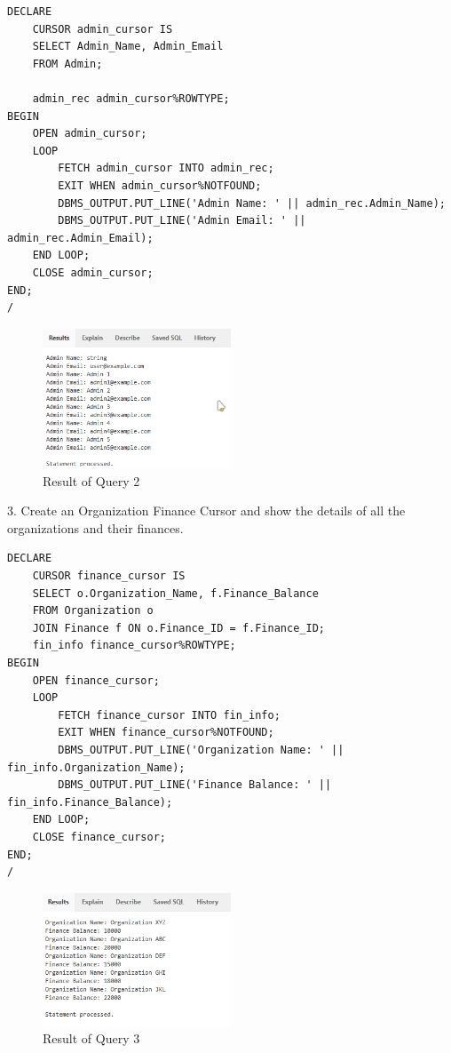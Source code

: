 \begin{lstlisting}[caption={ Query 2},label={lst:q-2}]
    DECLARE
    CURSOR admin_cursor IS
    SELECT Admin_Name, Admin_Email
    FROM Admin;
    
    admin_rec admin_cursor%ROWTYPE;
BEGIN
    OPEN admin_cursor;
    LOOP
        FETCH admin_cursor INTO admin_rec;
        EXIT WHEN admin_cursor%NOTFOUND;
        DBMS_OUTPUT.PUT_LINE('Admin Name: ' || admin_rec.Admin_Name);
        DBMS_OUTPUT.PUT_LINE('Admin Email: ' || admin_rec.Admin_Email);
    END LOOP;
    CLOSE admin_cursor;
END;
/
\end{lstlisting}
\clearpage
\begin{figure}[H]
    \centering
    \includegraphics[width=0.5\textwidth]{images/plsql/cursor/Admin Cursor.png}
    \caption{Result of Query 2}
\end{figure}
3. Create an Organization Finance Cursor and show the details of all the organizations and their finances.

\begin{lstlisting}[caption={ Query 3},label={lst:q-3}]
    DECLARE
    CURSOR finance_cursor IS
    SELECT o.Organization_Name, f.Finance_Balance
    FROM Organization o
    JOIN Finance f ON o.Finance_ID = f.Finance_ID;
    fin_info finance_cursor%ROWTYPE;
BEGIN
    OPEN finance_cursor;
    LOOP
        FETCH finance_cursor INTO fin_info;
        EXIT WHEN finance_cursor%NOTFOUND;
        DBMS_OUTPUT.PUT_LINE('Organization Name: ' || fin_info.Organization_Name);
        DBMS_OUTPUT.PUT_LINE('Finance Balance: ' || fin_info.Finance_Balance);
    END LOOP;
    CLOSE finance_cursor;
END;
/
\end{lstlisting}
\begin{figure}[H]
    \centering
    \includegraphics[width=0.5\textwidth]{images/plsql/cursor/Organization Finance Cursor.png}
    \caption{Result of Query 3}
\end{figure}